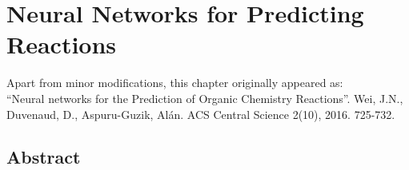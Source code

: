 \chapter{Neural Networks for Predicting Reactions}
\thispagestyle{plain}
\vspace{-.5cm}

\noindent Apart from minor modifications, this chapter originally appeared as:\newline\\
\ssp ``Neural networks for the Prediction of Organic Chemistry Reactions''.
Wei, J.N., Duvenaud, D., Aspuru-Guzik, Al\'an. ACS Central Science 2(10), 2016. 725-732. 

\section*{Abstract}
    \dsp
    


